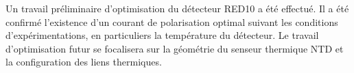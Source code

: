 Un travail préliminaire d'optimisation du détecteur RED10 a été effectué. Il a été confirmé l'existence d'un courant de polarisation optimal suivant les conditions d'expérimentations, en particuliers la température du détecteur. Le travail d'optimisation futur se focalisera sur la géométrie du senseur thermique NTD et la configuration des liens thermiques.